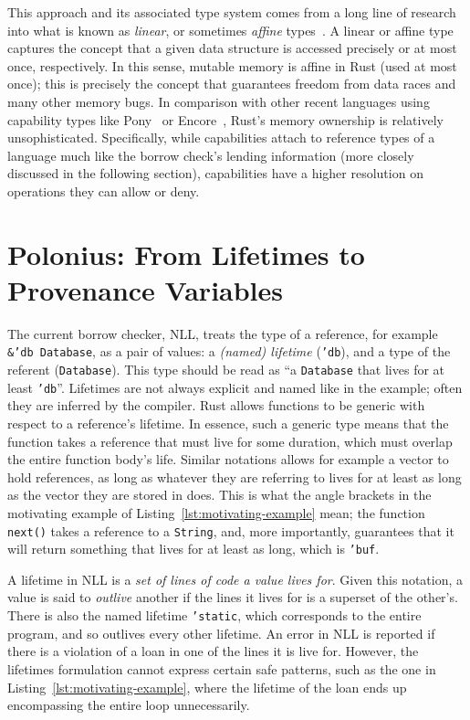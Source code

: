 \documentclass[11pt,a4paper,twoside,openany,draft]{report}
\newcommand{\InRust}[1]{\texttt{#1}}
\begin{document}
This approach and its associated type system comes from a long line of research
into what is known as \textit{linear}, or sometimes \textit{affine}
types~\cite{wadler1990linear}. A linear or affine type captures the concept that
a given data structure is accessed precisely or at most once, respectively. In
this sense, mutable memory is affine in Rust (used at most once); this is
precisely the concept that guarantees freedom from data races and many other
memory bugs. In comparison with other recent languages using capability types
like Pony~\cite{clebsch2015pony, Clebsch:2015:DCS:2824815.2824816} or
Encore~\cite{castegren2018capability}, Rust's memory ownership is relatively
unsophisticated. Specifically, while capabilities attach to reference types of a
language much like the borrow check's lending information (more closely
discussed in the following section), capabilities have a higher resolution on
operations they can allow or deny.

\section{Polonius: From Lifetimes to Provenance
  Variables}\label{sec:reference-provenance}

The current borrow checker, NLL, treats the type of a reference, for example
\InRust{&'db Database}, as a pair of values: a \textit{(named) lifetime}
(\InRust{'db}), and a type of the referent (\InRust{Database}). This type should
be read as ``a \InRust{Database} that lives for at least \InRust{'db}''.
Lifetimes are not always explicit and named like in the example; often they are
inferred by the compiler. Rust allows functions to be generic with respect to a
reference's lifetime. In essence, such a generic type means that the function
takes a reference that must live for some duration, which must overlap the
entire function body's life. Similar notations allows for example a vector to
hold references, as long as whatever they are referring to lives for at least as
long as the vector they are stored in does. This is what the angle brackets in
the motivating example of Listing~\ref{lst:motivating-example} mean; the
function \InRust{next()} takes a reference to a \InRust{String}, and, more
importantly, guarantees that it will return something that lives for at least as
long, which is \InRust{'buf}.

A lifetime in NLL is a \textit{set of lines of code a value lives for}. Given
this notation, a value is said to \textit{outlive} another if the lines it lives
for is a superset of the other's. There is also the named lifetime
\InRust{'static}, which corresponds to the entire program, and so outlives every
other lifetime. An error in NLL is reported if there is a violation of a loan in
one of the lines it is live for. However, the lifetimes formulation cannot
express certain safe patterns, such as the one in
Listing~\ref{lst:motivating-example}, where the lifetime of the loan ends up
encompassing the entire loop unnecessarily.
\end{document}
